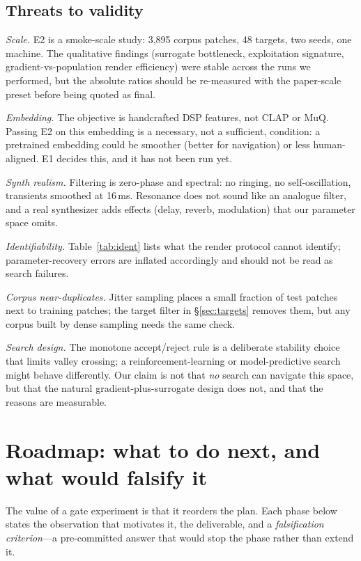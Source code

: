 \documentclass[11pt]{article}
\newcommand{\nTarg}{48}
\begin{document}
\subsection{Threats to validity}\label{sec:threats}

\emph{Scale.} E2 is a smoke-scale study: 3{,}895 corpus patches, \nTarg{}
targets, two seeds, one machine. The qualitative findings (surrogate bottleneck,
exploitation signature, gradient-vs-population render efficiency) were stable
across the runs we performed, but the absolute ratios should be re-measured with
the paper-scale preset before being quoted as final.

\emph{Embedding.} The objective is handcrafted DSP features, not CLAP or MuQ.
Passing E2 on this embedding is a necessary, not a sufficient, condition: a
pretrained embedding could be smoother (better for navigation) or less
human-aligned. E1 decides this, and it has not been run yet.

\emph{Synth realism.} Filtering is zero-phase and spectral: no ringing, no
self-oscillation, transients smoothed at 16\,ms. Resonance does not sound like an
analogue filter, and a real synthesizer adds effects (delay, reverb, modulation)
that our parameter space omits.

\emph{Identifiability.} Table~\ref{tab:ident} lists what the render protocol
cannot identify; parameter-recovery errors are inflated accordingly and should
not be read as search failures.

\emph{Corpus near-duplicates.} Jitter sampling places a small fraction of test
patches next to training patches; the target filter in \S\ref{sec:targets}
removes them, but any corpus built by dense sampling needs the same check.

\emph{Search design.} The monotone accept/reject rule is a deliberate stability
choice that limits valley crossing; a reinforcement-learning or model-predictive
search might behave differently. Our claim is not that \emph{no} search can
navigate this space, but that the natural gradient-plus-surrogate design does
not, and that the reasons are measurable.

\section{Roadmap: what to do next, and what would falsify it}\label{sec:roadmap}

The value of a gate experiment is that it reorders the plan. Each phase below
states the observation that motivates it, the deliverable, and a
\emph{falsification criterion}---a pre-committed answer that would stop the
phase rather than extend it.
\end{document}
